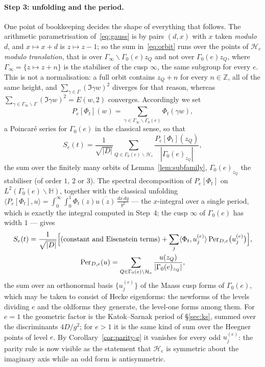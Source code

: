 \documentclass[11pt,a4paper]{article}
\theoremstyle{remark}\newtheorem{remark}[theorem]{Remark}
\newcommand{\Z}{\mathbb Z}\newcommand{\R}{\mathbb R}\newcommand{\Q}{\mathbb Q}\newcommand{\C}{\mathbb C}
\begin{document}
\paragraph{Step 3: unfolding and the period.} One point of bookkeeping decides the shape of everything that follows.
The arithmetic parametrisation of~\eqref{eq:gauss} is by pairs $(d,x)$ with $x$ taken \emph{modulo} $d$, and
$x\mapsto x+d$ is $z\mapsto z-1$; so the sum in~\eqref{eq:orbit} runs over the points of $\mathcal H_e$ \emph{modulo
translation}, that is over $\Gamma_\infty\backslash\Gamma_0(e)z_Q$ and not over $\Gamma_0(e)z_Q$, where
$\Gamma_\infty=\{z\mapsto z+n\}$ is the stabiliser of the cusp $\infty$, the same subgroup for every $e$. This is not a
normalisation: a full orbit contains $z_Q+n$ for every $n\in\Z$, all of the same height, and
$\sum_{\gamma\in\Gamma}(\Im\gamma w)^2$ diverges for that reason, whereas
$\sum_{\gamma\in\Gamma_\infty\backslash\Gamma}(\Im\gamma w)^2=E(w,2)$ converges. Accordingly we set
\[
P_e[\Phi_t](w)=\sum_{\gamma\in\Gamma_\infty\backslash\Gamma_0(e)}\Phi_t(\gamma w),
\]
a Poincar\'e series for $\Gamma_0(e)$ in the classical sense, so that
\[
S_e(t)=\frac1{\sqrt{|D|}}\sum_{Q\in\Gamma_0(e)\backslash\mathcal H_e}\frac{P_e[\Phi_t](z_Q)}{|\Gamma_0(e)_{z_Q}|},
\]
the sum over the finitely many orbits of Lemma~\ref{lem:subfamily}, $\Gamma_0(e)_{z_Q}$ the stabiliser (of order $1$,
$2$ or $3$). The spectral decomposition of $P_e[\Phi_t]$ on $L^2(\Gamma_0(e)\backslash\mathbb H)$, together with the
classical unfolding $\langle P_e[\Phi_t],u\rangle=\int_0^\infty\!\!\int_0^1\Phi_t(z)\overline{u(z)}\,\frac{dx\,dy}{y^2}$
--- the $x$-integral over a single period, which is exactly the integral computed in Step~4; the cusp $\infty$ of
$\Gamma_0(e)$ has width $1$ --- gives
\begin{equation}\label{eq:spectral}
\begin{gathered}
S_e(t)=\frac1{\sqrt{|D|}}\Bigl[(\text{constant and Eisenstein terms})+\sum_{j}\langle\Phi_t,u^{(e)}_j\rangle\,\mathrm{Per}_{D,e}\bigl(u^{(e)}_j\bigr)\Bigr],\\
\mathrm{Per}_{D,e}(u)=\sum_{Q\in\Gamma_0(e)\backslash\mathcal H_e}\frac{u(z_Q)}{|\Gamma_0(e)_{z_Q}|},
\end{gathered}
\end{equation}
the sum over an orthonormal basis $\{u^{(e)}_j\}$ of the Maass cusp forms of $\Gamma_0(e)$, which may be taken to
consist of Hecke eigenforms: the newforms of the levels dividing $e$ and the oldforms they generate, the level-one
forms among them. For $e=1$ the geometric factor is the Katok--Sarnak period of \S\ref{sec:ks}, summed over the
discriminants $4D/g^2$; for $e>1$ it is the same kind of sum over the Heegner points of level $e$. By
Corollary~\ref{cor:parity-e} it vanishes for every odd $u^{(e)}_j$: the parity rule is now visible as the statement
that $\mathcal H_e$ is symmetric about the imaginary axis while an odd form is antisymmetric.
\end{document}

